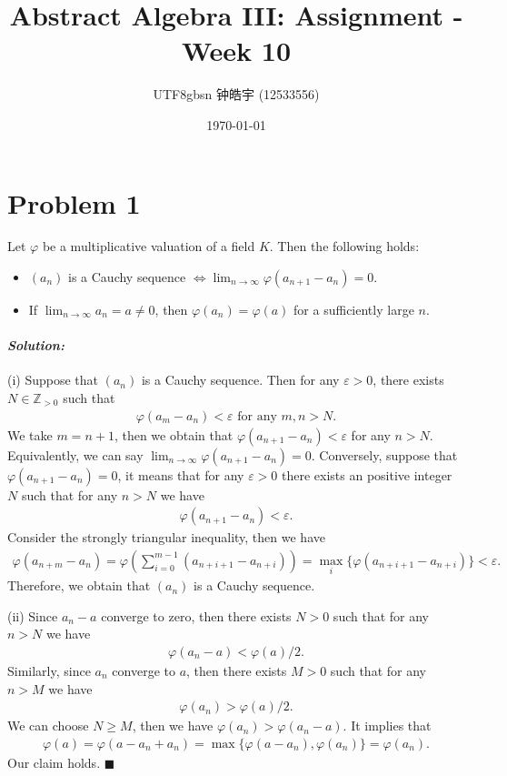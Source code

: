 \documentclass[12pt, a4paper]{article}
\title{Abstract Algebra III: Assignment - Week 10}
\author{
    \begin{CJK*}{UTF8}{gbsn}
    钟皓宇 (12533556)
    \end{CJK*}
}
\date{\today}
\theoremstyle{remark}
\newenvironment{solution}
  {\paragraph{\textit{Solution:}}\par\medskip}
  {\hfill$\blacksquare$\vspace{0.1cm}}
\begin{document}
\maketitle
\section*{Problem 1}

Let $\varphi$ be a multiplicative valuation of a field $K$. Then the following holds:
\begin{itemize}
    \item[(i)] $(a_n)$ is a Cauchy sequence $\Leftrightarrow \lim_{n\to\infty} \varphi(a_{n+1} - a_n) = 0$.
    \item[(ii)] If $\lim_{n\to\infty} a_n = a \neq 0$, then $\varphi(a_n) = \varphi(a)$ for a sufficiently large $n$.
\end{itemize}
\begin{solution}
    (i) Suppose that $(a_n)$ is a Cauchy sequence. Then for any $\varepsilon>0$, there exists $N\in \mathbb{Z}_{>0}$ such that 
    \begin{align*}
        \varphi(a_m-a_n)<\varepsilon \text{ for any }m,n>N.
    \end{align*}
    We take $m=n+1$, then we obtain that $\varphi(a_{n+1}-a_n)<\varepsilon$ for any $n>N$. Equivalently, we can say $\lim_{n\to\infty} \varphi(a_{n+1} - a_n) = 0$.
    Conversely, suppose that $\varphi(a_{n+1} - a_n) = 0$, it means that for any $\varepsilon>0$ there exists an positive integer $N$ such that for any $n>N$ we have 
    \begin{align*}
        \varphi(a_{n+1}-a_n)<\varepsilon.
    \end{align*}
    Consider the strongly triangular inequality, then we have 
    \begin{align*}
        \varphi(a_{n+m}-a_n)=\varphi\left(\sum_{i=0}^{m-1}(a_{n+i+1}-a_{n+i})\right) = \max_{i}\{\varphi(a_{n+i+1}-a_{n+i})\}<\varepsilon.
    \end{align*}
    Therefore, we obtain that $(a_n)$ is a Cauchy sequence.

    (ii) Since $a_n-a$ converge to zero, then there exists $N>0$ such that for any $n>N$ we have 
    \begin{align*}
        \varphi(a_n-a)<\varphi(a)/2.
    \end{align*}
    Similarly, since $a_n$ converge to $a$, then there exists $M>0$ such that for any $n>M$ we have 
    \begin{align*}
        \varphi(a_n)>\varphi(a)/2.
    \end{align*}
    We can choose $N\ge M$, then we have $\varphi(a_n)>\varphi(a_n-a)$. It implies that 
    \begin{align*}
        \varphi(a)=\varphi(a-a_n+a_n)= \max\{\varphi(a-a_n),\varphi(a_n)\}=\varphi(a_n).
    \end{align*}
    Our claim holds.
\end{solution}
\end{document}
